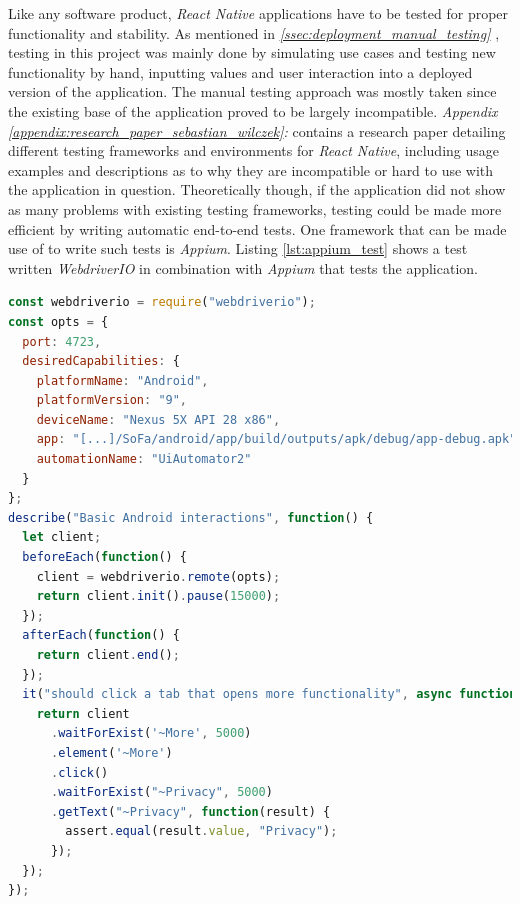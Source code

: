 Like any software product, \textit{React Native} applications have to be tested for proper functionality and stability. As mentioned in \textit{\ref{ssec:deployment_manual_testing} }, testing in this project was mainly done by simulating use cases and testing new functionality by hand, inputting values and user interaction into a deployed version of the application.
\newline
The manual testing approach was mostly taken since the existing base of the application proved to be largely incompatible. \textit{Appendix \ref{appendix:research_paper_sebastian_wilczek}: } contains a research paper detailing different testing frameworks and environments for \textit{React Native}, including usage examples and descriptions as to why they are incompatible or hard to use with the application in question.
\newline
Theoretically though, if the application did not show as many problems with existing testing frameworks, testing could be made more efficient by writing automatic end-to-end tests. One framework that can be made use of to write such tests is \textit{Appium}. Listing \ref{lst:appium_test} shows a test written \textit{WebdriverIO} in combination with \textit{Appium} that tests the application.

\begin{lstlisting}[language=javascript, caption=\textit{Appium} end-to-end test, label=lst:appium_test]
const webdriverio = require("webdriverio");
const opts = {
  port: 4723,
  desiredCapabilities: {
    platformName: "Android",
    platformVersion: "9",
    deviceName: "Nexus 5X API 28 x86",
    app: "[...]/SoFa/android/app/build/outputs/apk/debug/app-debug.apk",
    automationName: "UiAutomator2"
  }
};
describe("Basic Android interactions", function() {
  let client;
  beforeEach(function() {
    client = webdriverio.remote(opts);
    return client.init().pause(15000);
  });
  afterEach(function() {
    return client.end();
  });
  it("should click a tab that opens more functionality", async function() {
    return client
      .waitForExist('~More', 5000)
      .element('~More')
      .click()
      .waitForExist("~Privacy", 5000)
      .getText("~Privacy", function(result) {
        assert.equal(result.value, "Privacy");
      });
  });
});
\end{lstlisting}

